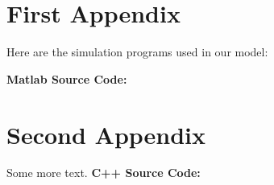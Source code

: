 \documentclass{mcmthesis}
\begin{document}
\begin{appendices}
\section{First Appendix}
\lipsum[13]
Here are the simulation programs used in our model:

\textbf{\textcolor[rgb]{0.98,0.00,0.00}{Matlab Source Code:}}
% 

\section{Second Appendix}
Some more text. \textbf{\textcolor[rgb]{0.98,0.00,0.00}{C++ Source Code:}}
% 
\end{appendices}
\end{document}
